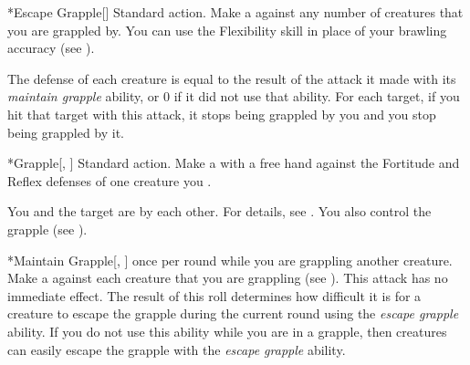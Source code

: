     \begin{activeability}*{Escape Grapple}[]
      \abilityusagetime Standard action.
      \rankline
      Make a  against any number of creatures that you are grappled by.
      You can use the Flexibility skill in place of your brawling accuracy (see ).

      The defense of each creature is equal to the result of the attack it made with its \textit{maintain grapple} ability, or 0 if it did not use that ability.
      For each target, if you hit that target with this attack, it stops being grappled by you and you stop being grappled by it.
    \end{activeability}

    \begin{activeability}*{Grapple}[, ]
      \abilityusagetime Standard action.
      \rankline
      Make a  with a free hand against the Fortitude and Reflex defenses of one creature you .

      \hit You and the target are \grappled by each other.
      For details, see .
      \crit You also control the grapple (see ).
    \end{activeability}

    \begin{activeability}*{Maintain Grapple}[, ]
      \abilityusagetime {} once per round while you are grappling another creature.
      \rankline
      Make a  against each creature that you are grappling (see ).
      This attack has no immediate effect.
      The result of this roll determines how difficult it is for a creature to escape the grapple during the current round using the \textit{escape grapple} ability.
      If you do not use this ability while you are in a grapple, then creatures can easily escape the grapple with the \textit{escape grapple} ability.
    \end{activeability}

